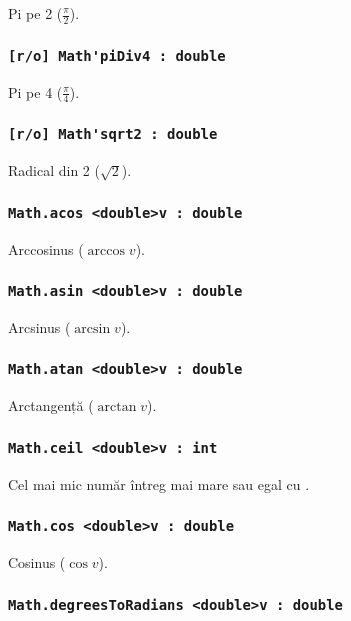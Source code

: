 Pi pe 2 ($\frac{\pi}{2}$).

\subsubsection{\lstinline|[r/o] Math'piDiv4 : double|}

Pi pe 4 ($\frac{\pi}{4}$).

\subsubsection{\lstinline|[r/o] Math'sqrt2 : double|}

Radical din 2 ($\sqrt{2}$).

\subsubsection{\lstinline|Math.acos <double>v : double|}

Arccosinus ($\arccos{v}$).

\subsubsection{\lstinline|Math.asin <double>v : double|}

Arcsinus ($\arcsin{v}$).

\subsubsection{\lstinline|Math.atan <double>v : double|}

Arctangență ($\arctan{v}$).

\subsubsection{\lstinline|Math.ceil <double>v : int|}

Cel mai mic număr întreg mai mare sau egal cu .

\subsubsection{\lstinline|Math.cos <double>v : double|}

Cosinus ($\cos{v}$).

\subsubsection{\lstinline|Math.degreesToRadians <double>v : double|}

